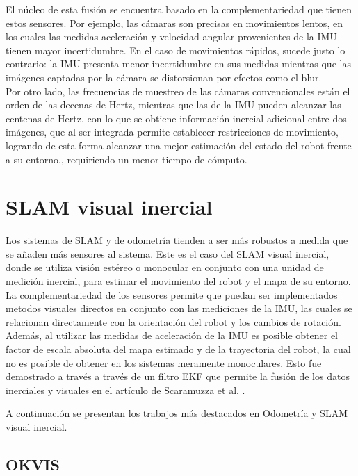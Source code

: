 {El núcleo de esta fusión se encuentra basado en la complementariedad que tienen estos sensores. Por ejemplo, las cámaras son precisas en movimientos lentos, en los cuales las medidas aceleración y velocidad angular provenientes de la IMU tienen mayor incertidumbre. En el caso de movimientos rápidos, sucede justo lo contrario: la IMU presenta menor incertidumbre en sus medidas mientras que las imágenes captadas por la cámara se distorsionan por efectos como el blur. \\

Por otro lado,  las frecuencias de muestreo de las cámaras convencionales están el orden de las decenas de Hertz, mientras que las de la IMU pueden alcanzar las centenas de Hertz, con lo que se  obtiene información inercial adicional entre dos imágenes, que al ser integrada permite establecer restricciones de movimiento,  logrando de esta forma alcanzar una mejor estimación del estado del robot frente a su entorno., requiriendo un menor tiempo de cómputo. \\



\section{SLAM visual inercial}

Los sistemas de SLAM y de odometría tienden a ser más robustos a medida que se añaden más sensores al sistema. Este es el caso del SLAM visual inercial, donde se utiliza visión estéreo o monocular en conjunto con una unidad de medición inercial, para estimar el movimiento del robot y el mapa de su entorno.  La complementariedad de los sensores permite que puedan ser implementados metodos visuales directos en conjunto con las mediciones de la IMU, las cuales se relacionan directamente con la orientación del robot y los cambios de rotación. Además, al utilizar las medidas de aceleración de la IMU es posible obtener el factor de escala absoluta  del mapa estimado y de la trayectoria del robot, la cual no es posible de obtener en los sistemas meramente monoculares. Esto fue demostrado a través a través de un filtro EKF que permite la fusión de los datos inerciales y visuales en el artículo de  Scaramuzza et al. \cite{scaramuzza}.

A continuación se presentan los trabajos más destacados en Odometría y SLAM visual inercial.

\subsection{OKVIS}

}
